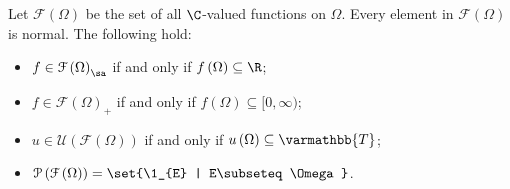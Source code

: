 \documentclass[10pt]{mypackage}
\renewcommand*{\mathbb}[1]{\varmathbb{#1}}
\newcommand{\T}{\mathbb{T}}
\begin{document}
\begin{example}
  Let $\mathcal{F}\left(\Omega\right)$ be the set of all $\C$-valued functions on $\Omega$. Every element in $\mathcal{F}\left(\Omega\right)$ is normal. The following hold:
  \begin{itemize}
    \item $f\in \mathcal{F}\left(\Omega\right)_{\sa}$ if and only if $f\left(\Omega\right)\subseteq \R$;
    \item $f\in \mathcal{F}\left(\Omega\right)_{+}$ if and only if $f\left(\Omega\right)\subseteq [0,\infty)$;
    \item $u\in \mathcal{U}\left(\mathcal{F}\left(\Omega\right)\right)$ if and only if $u\left(\Omega\right)\subseteq \T$;
    \item $\mathcal{P}\left(\mathcal{F}\left(\Omega\right)\right) = \set{\1_{E} | E\subseteq \Omega}$.
  \end{itemize}
\end{example}
\end{document}
